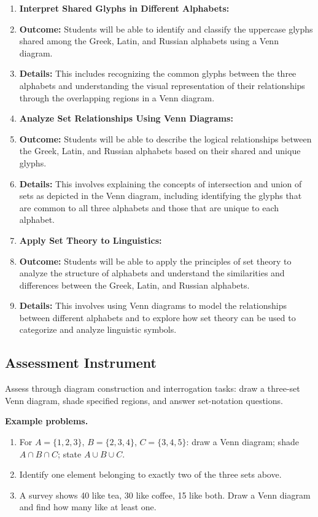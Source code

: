 \begin{enumerate}
    \item \textbf{Interpret Shared Glyphs in Different Alphabets:}
    \item \textbf{Outcome:} Students will be able to identify and classify the uppercase glyphs shared among the Greek, Latin, and Russian alphabets using a Venn diagram.
    \item \textbf{Details:} This includes recognizing the common glyphs between the three alphabets and understanding the visual representation of their relationships through the overlapping regions in a Venn diagram.
    \item \textbf{Analyze Set Relationships Using Venn Diagrams:}
    \item \textbf{Outcome:} Students will be able to describe the logical relationships between the Greek, Latin, and Russian alphabets based on their shared and unique glyphs.
    \item \textbf{Details:} This involves explaining the concepts of intersection and union of sets as depicted in the Venn diagram, including identifying the glyphs that are common to all three alphabets and those that are unique to each alphabet.
    \item \textbf{Apply Set Theory to Linguistics:}
    \item \textbf{Outcome:} Students will be able to apply the principles of set theory to analyze the structure of alphabets and understand the similarities and differences between the Greek, Latin, and Russian alphabets.
    \item \textbf{Details:} This involves using Venn diagrams to model the relationships between different alphabets and to explore how set theory can be used to categorize and analyze linguistic symbols.
\end{enumerate}


\subsection{Assessment Instrument}
\label{ssec:asse-3669}


Assess through diagram construction and interrogation tasks: draw a
three-set Venn diagram, shade specified regions, and answer set-notation
questions.

\textbf{Example problems.}
\begin{enumerate}
    \item For $A=\{1,2,3\}$, $B=\{2,3,4\}$, $C=\{3,4,5\}$:
          draw a Venn diagram; shade $A\cap B\cap C$;
          state $A\cup B\cup C$.
    \item Identify one element belonging to exactly two of the three sets
          above.
    \item A survey shows 40 like tea, 30 like coffee, 15 like both.
          Draw a Venn diagram and find how many like at least one.
\end{enumerate}



